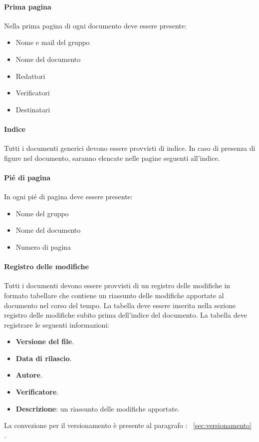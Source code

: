 \documentclass{article}
\begin{document}
\paragraph*{Prima pagina}
Nella prima pagina di ogni documento deve essere presente:
\begin{itemize}
    \item Nome e mail del gruppo
    \item Nome del documento
    \item Redattori
    \item Verificatori
    \item Destinatari
\end{itemize}
\paragraph*{Indice}
Tutti i documenti generici devono essere provvisti di indice.
In caso di presenza di figure nel documento, saranno elencate nelle pagine seguenti all'indice.
\paragraph*{Pié di pagina}
In ogni pié di pagina deve essere presente:
\begin{itemize}
    \item Nome del gruppo
    \item Nome del documento
    \item Numero di pagina
\end{itemize}
\paragraph*{Registro delle modifiche}\label{sec:RegistroModifiche}
Tutti i documenti devono essere provvisti di un registro delle modifiche in formato tabellare che contiene un riassunto
delle modifiche apportate al documento nel corso del tempo.
La tabella  deve essere inserita nella
sezione registro delle modifiche subito prima dell’indice del documento.
La tabella deve registrare le seguenti informazioni:
\begin{itemize}
    \item \textbf{Versione del file}.
    \item \textbf{Data di rilascio}.
    \item \textbf{Autore}.
    \item \textbf{Verificatore}.
    \item \textbf{Descrizione}: un riassunto delle modifiche apportate.
\end{itemize}
La convezione per il versionamento è presente al paragrafo : ~\ref{sec:versionamento} .
\end{document}
